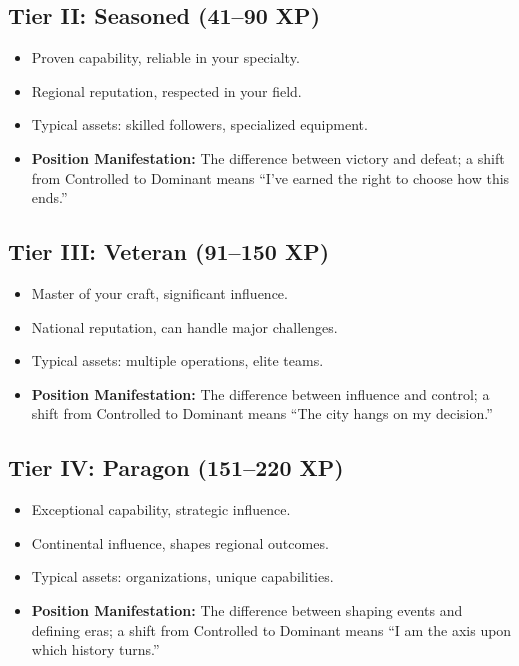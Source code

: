 \subsection{Tier II: Seasoned (41–90 XP)}
\label{sec:tier-ii}
\begin{itemize}
\item Proven capability, reliable in your specialty.
\item Regional reputation, respected in your field.
\item Typical assets: skilled followers, specialized equipment.
\item \textbf{Position Manifestation:} The difference between victory and defeat; a shift from Controlled to Dominant means “I've earned the right to choose how this ends.”
\end{itemize}

\subsection{Tier III: Veteran (91–150 XP)}
\label{sec:tier-iii}
\begin{itemize}
\item Master of your craft, significant influence.
\item National reputation, can handle major challenges.
\item Typical assets: multiple operations, elite teams.
\item \textbf{Position Manifestation:} The difference between influence and control; a shift from Controlled to Dominant means “The city hangs on my decision.”
\end{itemize}

\subsection{Tier IV: Paragon (151–220 XP)}
\label{sec:tier-iv}
\begin{itemize}
\item Exceptional capability, strategic influence.
\item Continental influence, shapes regional outcomes.
\item Typical assets: organizations, unique capabilities.
\item \textbf{Position Manifestation:} The difference between shaping events and defining eras; a shift from Controlled to Dominant means “I am the axis upon which history turns.”
\end{itemize}

